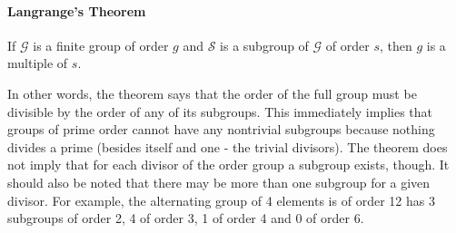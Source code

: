 





\paragraph{Langrange's Theorem} If $\mathcal{G}$ is a finite group of order $g$ and $\mathcal{S}$ is a subgroup of  $\mathcal{G}$ of order $s$, then $g$ is a multiple of $s$.


\medskip
In other words, the theorem says that the order of the full group must be divisible by the order of any of its subgroups. This immediately implies that groups of prime order cannot have any nontrivial subgroups because nothing divides a prime (besides itself and one - the trivial divisors). The theorem does not imply that for each divisor of the order group a subgroup exists, though. It should also be noted that there may be more than one subgroup for a given divisor. For example, the alternating group of 4 elements is of order 12 has 3 subgroups of order 2, 4 of order 3, 1 of order 4 and 0 of order 6.




